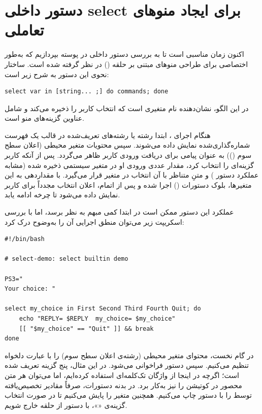 \section{دستور داخلی select برای ایجاد منوهای تعاملی}

اکنون زمان مناسبی است تا به بررسی دستور داخلی  در پوسته بپردازیم که به‌طور اختصاصی برای طراحی منوهای مبتنی بر حلقه () در نظر گرفته شده است. ساختار نحوی این دستور به شرح زیر است:

\begin{latin}
\begin{lstlisting}
select var in [string... ;] do commands; done
\end{lstlisting}
\end{latin}

در این الگو،  نشان‌دهنده نام متغیری است که انتخاب کاربر را ذخیره می‌کند و  شامل عناوین گزینه‌های منو است.

هنگام اجرای ، ابتدا رشته یا رشته‌های تعریف‌شده در قالب یک فهرست شماره‌گذاری‌شده نمایش داده می‌شوند. سپس محتویات متغیر محیطی  (اعلان سطح سوم ()) به عنوان پیامی برای دریافت ورودی کاربر ظاهر می‌گردد. پس از آنکه کاربر گزینه‌ای را انتخاب کرد، مقدار عددی ورودی او در متغیر سیستمی  ذخیره شده (مشابه عملکرد دستور ) و متنِ متناظر با آن انتخاب در متغیر  قرار می‌گیرد. با مقداردهی به این متغیرها، بلوک دستورات () اجرا شده و پس از اتمام، اعلان انتخاب مجدداً برای کاربر نمایش داده می‌شود تا چرخه ادامه یابد.

عملکرد این دستور ممکن است در ابتدا کمی مبهم به نظر برسد، اما با بررسی اسکریپت زیر می‌توان منطق اجرایی آن را به‌وضوح درک کرد:

\begin{latin}
\begin{lstlisting}
#!/bin/bash

# select-demo: select builtin demo

PS3="
Your choice: "

select my_choice in First Second Third Fourth Quit; do
    echo "REPLY= $REPLY  my_choice= $my_choice"
    [[ "$my_choice" == "Quit" ]] && break
done
\end{lstlisting}
\end{latin}

در گام نخست، محتوای متغیر محیطی  (رشته‌ی اعلان سطح سوم) را با عبارت دلخواه تنظیم می‌کنیم. سپس دستور  فراخوانی می‌شود. در این مثال، پنج گزینه تعریف شده است؛ اگرچه در اینجا از واژگان تک‌کلمه‌ای استفاده کرده‌ایم، اما می‌توان هر متن محصور در کوتیشن را نیز به‌کار برد. در بدنه دستورات، صرفاً مقادیر تخصیص‌یافته توسط  را با دستور  چاپ می‌کنیم. همچنین متغیر  را پایش می‌کنیم تا در صورت انتخاب گزینه‌ی «»، با دستور  از حلقه خارج شویم.

